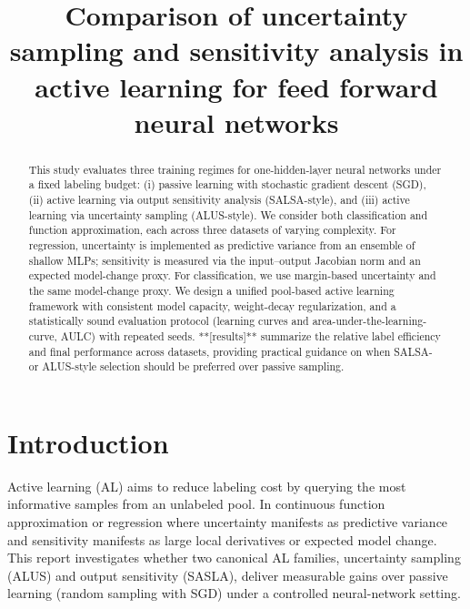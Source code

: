 \documentclass[conference]{IEEEtran}
\begin{document}
\title{Comparison of uncertainty sampling and sensitivity analysis in active learning for feed forward neural networks}
\author{
}
\maketitle
\begin{abstract}
This study evaluates three training regimes for one-hidden-layer neural networks under a fixed labeling budget: (i) passive learning with stochastic gradient descent (SGD), (ii) active learning via output sensitivity analysis (SALSA-style), and (iii) active learning via uncertainty sampling (ALUS-style). We consider both classification and function approximation, each across three datasets of varying complexity. For regression, uncertainty is implemented as predictive variance from an ensemble of shallow MLPs; sensitivity is measured via the input–output Jacobian norm and an expected model-change proxy. For classification, we use margin-based uncertainty and the same model-change proxy. We design a unified pool-based active learning framework with consistent model capacity, weight-decay regularization, and a statistically sound evaluation protocol (learning curves and area-under-the-learning-curve, AULC) with repeated seeds. **[results]** summarize the relative label efficiency and final performance across datasets, providing practical guidance on when SALSA- or ALUS-style selection should be preferred over passive sampling.
\end{abstract}

\section*{Introduction}
Active learning (AL) aims to reduce labeling cost by querying the most informative samples from an unlabeled pool. 
In continuous function approximation or regression where uncertainty manifests as predictive variance and sensitivity manifests as large local derivatives or expected model change. 
This report investigates whether two canonical AL families, uncertainty sampling (ALUS) and output sensitivity (SASLA),
deliver measurable gains over passive learning (random sampling with SGD) under a controlled neural-network setting.
\end{document}
